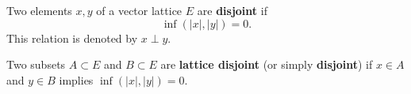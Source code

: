 Two elements $x, y$ of a vector lattice $E$ are \textbf{disjoint} if
$$\inf(|x|, |y|) = 0.$$
This relation is denoted by $x \perp y$.

Two subsets $A \subset E$ and $B \subset E$ are \textbf{lattice disjoint} (or simply \textbf{disjoint}) if $x \in A$ and $y \in B$ implies $\inf(|x|, |y|) = 0$.
